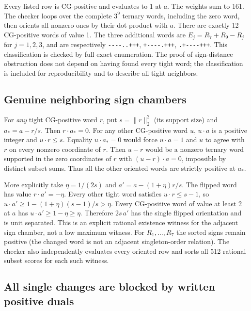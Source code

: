 \documentclass[
  11pt,
]{article}
\begin{document}
Every listed row is CG-positive and evaluates to 1 at \(a\). The weights
sum to 161. The checker loops over the complete \(3^9\) ternary words,
including the zero word, then orients all nonzero ones by their dot
product with \(a\). There are exactly 12 CG-positive words of value 1.
The three additional words are \(E_j=R_7+R_9-R_j\) for \(j=1,2,3\), and
are respectively \texttt{-\/-\/-\/-..+++}, \texttt{+-\/-\/-\/-.+++},
\texttt{.+-\/-\/-\/-+++}. This classification is checked by full exact
enumeration. The proof of sign-distance obstruction does not depend on
having found every tight word; the classification is included for
reproducibility and to describe all tight neighbors.

\subsection{Genuine neighboring sign
chambers}\label{genuine-neighboring-sign-chambers}

For \emph{any} tight CG-positive word \(r\), put
\(s=\lVert r\rVert_2^2\) (its support size) and \(a_*=a-r/s\). Then
\(r\cdot a_*=0\). For any other CG-positive word \(u\), \(u\cdot a\) is
a positive integer and \(u\cdot r\le s\). Equality \(u\cdot a_*=0\)
would force \(u\cdot a=1\) and \(u\) to agree with \(r\) on every
nonzero coordinate of \(r\). Then \(u-r\) would be a nonzero ternary
word supported in the zero coordinates of \(r\) with \((u-r)\cdot a=0\),
impossible by distinct subset sums. Thus all the other oriented words
are strictly positive at \(a_*\).

More explicitly take \(\eta=1/(2s)\) and \(a'=a-(1+\eta)r/s\). The
flipped word has value \(r\cdot a'=-\eta\). Every other tight word
satisfies \(u\cdot r\le s-1\), so
\(u\cdot a'\ge1-(1+\eta)(s-1)/s>\eta\). Every CG-positive word of value
at least 2 at \(a\) has \(u\cdot a'\ge1-\eta\ge\eta\). Therefore
\(2s\,a'\) has the single flipped orientation and is unit separated.
This is an explicit rational existence witness for the adjacent sign
chamber, not a low maximum witness. For \(R_1,\ldots,R_7\) the sorted
signs remain positive (the changed word is not an adjacent
singleton-order relation). The checker also independently evaluates
every oriented row and sorts all 512 rational subset scores for each
such witness.

\subsection{All single changes are blocked by written positive
duals}\label{all-single-changes-are-blocked-by-written-positive-duals}
\end{document}
